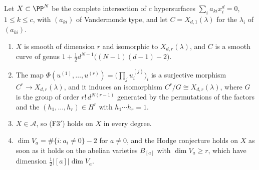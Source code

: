 \begin{theorem}\label{thm:vandermonde}
Let $X\subset\PP^{N}$ be the complete intersection of $c$ hypersurfaces
$\sum_{i}a_{ki}x_{i}^{d}=0$, $1\le k\le c$, with $(a_{ki})$ of Vandermonde
type, and let $C=X_{d,1}(\lambda)$ for the $\lambda_{i}$ of $(a_{ki})$.
\begin{enumerate}[label=\textup{(\roman*)},leftmargin=2.6em,itemsep=2pt]
\item $X$ is smooth of dimension $r$ and isomorphic to $X_{d,r}(\lambda)$,
  and $C$ is a smooth curve of genus
  $1+\tfrac12d^{N-1}\bigl((N-1)(d-1)-2\bigr)$.
\item The map
  $\Phi(u^{(1)},\dots,u^{(r)})=\bigl(\prod_{j}u^{(j)}_{i}\bigr)_{i}$ is a
  surjective morphism $C^{r}\to X_{d,r}(\lambda)$, and it induces an
  isomorphism $C^{r}/G\cong X_{d,r}(\lambda)$, where $G$ is the group of
  order $r!\,d^{N(r-1)}$ generated by the permutations of the factors and the
  $(h_{1},\dots,h_{r})\in H^{r}$ with $h_{1}\cdots h_{r}=1$.
\item $X\in\mathcal{A}$, so \textup{(F3$'$)} holds on $X$ in every degree.
\item $\dim V_{a}=\#\{i:a_{i}\ne0\}-2$ for $a\ne0$, and the Hodge conjecture
  holds on $X$ as soon as it holds on the abelian varieties $B_{[a]}$ with
  $\dim V_{a}\ge r$, which have dimension $\tfrac12|[a]|\dim V_{a}$.
\end{enumerate}
\end{theorem}

